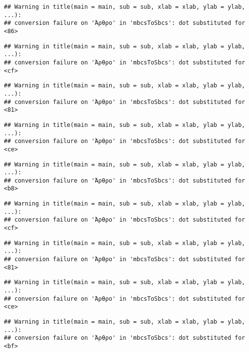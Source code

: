 \documentclass[
]{article}
\begin{document}
\begin{verbatim}
## Warning in title(main = main, sub = sub, xlab = xlab, ylab = ylab, ...):
## conversion failure on 'Άρθρο' in 'mbcsToSbcs': dot substituted for <86>
\end{verbatim}

\begin{verbatim}
## Warning in title(main = main, sub = sub, xlab = xlab, ylab = ylab, ...):
## conversion failure on 'Άρθρο' in 'mbcsToSbcs': dot substituted for <cf>
\end{verbatim}

\begin{verbatim}
## Warning in title(main = main, sub = sub, xlab = xlab, ylab = ylab, ...):
## conversion failure on 'Άρθρο' in 'mbcsToSbcs': dot substituted for <81>
\end{verbatim}

\begin{verbatim}
## Warning in title(main = main, sub = sub, xlab = xlab, ylab = ylab, ...):
## conversion failure on 'Άρθρο' in 'mbcsToSbcs': dot substituted for <ce>
\end{verbatim}

\begin{verbatim}
## Warning in title(main = main, sub = sub, xlab = xlab, ylab = ylab, ...):
## conversion failure on 'Άρθρο' in 'mbcsToSbcs': dot substituted for <b8>
\end{verbatim}

\begin{verbatim}
## Warning in title(main = main, sub = sub, xlab = xlab, ylab = ylab, ...):
## conversion failure on 'Άρθρο' in 'mbcsToSbcs': dot substituted for <cf>
\end{verbatim}

\begin{verbatim}
## Warning in title(main = main, sub = sub, xlab = xlab, ylab = ylab, ...):
## conversion failure on 'Άρθρο' in 'mbcsToSbcs': dot substituted for <81>
\end{verbatim}

\begin{verbatim}
## Warning in title(main = main, sub = sub, xlab = xlab, ylab = ylab, ...):
## conversion failure on 'Άρθρο' in 'mbcsToSbcs': dot substituted for <ce>
\end{verbatim}

\begin{verbatim}
## Warning in title(main = main, sub = sub, xlab = xlab, ylab = ylab, ...):
## conversion failure on 'Άρθρο' in 'mbcsToSbcs': dot substituted for <bf>
\end{verbatim}
\end{document}
